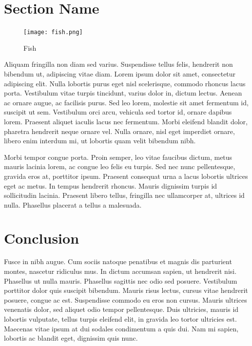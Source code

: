 \documentclass[a4paper, 11pt]{article} %
\begin{document}
\section*{Section Name}


\begin{figure} %
\begin{center}
\texttt{[image: fish.png]}
\end{center}
\caption{Fish}
\end{figure}

Aliquam fringilla non diam sed varius. Suspendisse tellus felis, hendrerit non bibendum ut, adipiscing vitae diam. Lorem ipsum dolor sit amet, consectetur adipiscing elit. Nulla lobortis purus eget nisl scelerisque, commodo rhoncus lacus porta. Vestibulum vitae turpis tincidunt, varius dolor in, dictum lectus. Aenean ac ornare augue, ac facilisis purus. Sed leo lorem, molestie sit amet fermentum id, suscipit ut sem. Vestibulum orci arcu, vehicula sed tortor id, ornare dapibus lorem. Praesent aliquet iaculis lacus nec fermentum. Morbi eleifend blandit dolor, pharetra hendrerit neque ornare vel. Nulla ornare, nisl eget imperdiet ornare, libero enim interdum mi, ut lobortis quam velit bibendum nibh.

Morbi tempor congue porta. Proin semper, leo vitae faucibus dictum, metus mauris lacinia lorem, ac congue leo felis eu turpis. Sed nec nunc pellentesque, gravida eros at, porttitor ipsum. Praesent consequat urna a lacus lobortis ultrices eget ac metus. In tempus hendrerit rhoncus. Mauris dignissim turpis id sollicitudin lacinia. Praesent libero tellus, fringilla nec ullamcorper at, ultrices id nulla. Phasellus placerat a tellus a malesuada.


\section*{Conclusion}

Fusce in nibh augue. Cum sociis natoque penatibus et magnis dis parturient montes, nascetur ridiculus mus. In dictum accumsan sapien, ut hendrerit nisi. Phasellus ut nulla mauris. Phasellus sagittis nec odio sed posuere. Vestibulum porttitor dolor quis suscipit bibendum. Mauris risus lectus, cursus vitae hendrerit posuere, congue ac est. Suspendisse commodo eu eros non cursus. Mauris ultrices venenatis dolor, sed aliquet odio tempor pellentesque. Duis ultricies, mauris id lobortis vulputate, tellus turpis eleifend elit, in gravida leo tortor ultricies est. Maecenas vitae ipsum at dui sodales condimentum a quis dui. Nam mi sapien, lobortis ac blandit eget, dignissim quis nunc.
\end{document}
